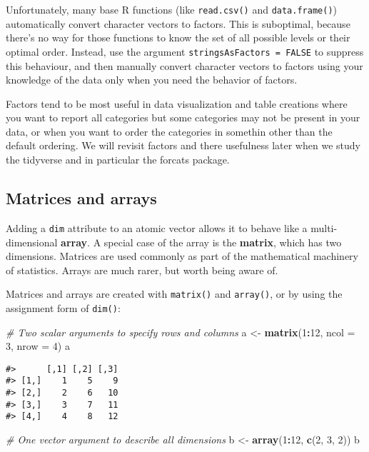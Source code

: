 \documentclass[]{book}
\newenvironment{Shaded}{\begin{snugshade}}{\end{snugshade}}
\newcommand{\KeywordTok}[1]{\textcolor[rgb]{0.13,0.29,0.53}{\textbf{#1}}}
\newcommand{\DataTypeTok}[1]{\textcolor[rgb]{0.13,0.29,0.53}{#1}}
\newcommand{\DecValTok}[1]{\textcolor[rgb]{0.00,0.00,0.81}{#1}}
\newcommand{\StringTok}[1]{\textcolor[rgb]{0.31,0.60,0.02}{#1}}
\newcommand{\CommentTok}[1]{\textcolor[rgb]{0.56,0.35,0.01}{\textit{#1}}}
\newcommand{\OperatorTok}[1]{\textcolor[rgb]{0.81,0.36,0.00}{\textbf{#1}}}
\newcommand{\NormalTok}[1]{#1}
\theoremstyle{definition}
\theoremstyle{definition}
\theoremstyle{definition}
\theoremstyle{remark}
\begin{document}
Unfortunately, many base R functions (like \texttt{read.csv()} and
\texttt{data.frame()}) automatically convert character vectors to
factors. This is suboptimal, because there's no way for those functions
to know the set of all possible levels or their optimal order. Instead,
use the argument \texttt{stringsAsFactors\ =\ FALSE} to suppress this
behaviour, and then manually convert character vectors to factors using
your knowledge of the data only when you need the behavior of factors.

Factors tend to be most useful in data visualization and table creations
where you want to report all categories but some categories may not be
present in your data, or when you want to order the categories in
somethin other than the default ordering. We will revisit factors and
there usefulness later when we study the tidyverse and in particular the
forcats package.

\subsection{Matrices and arrays}\label{matrices-and-arrays}

Adding a \texttt{dim} attribute to an atomic vector allows it to behave
like a multi-dimensional \textbf{array}. A special case of the array is
the \textbf{matrix}, which has two dimensions. Matrices are used
commonly as part of the mathematical machinery of statistics. Arrays are
much rarer, but worth being aware of.

Matrices and arrays are created with \texttt{matrix()} and
\texttt{array()}, or by using the assignment form of \texttt{dim()}:

\begin{Shaded}
\begin{Highlighting}[]
\CommentTok{# Two scalar arguments to specify rows and columns}
\NormalTok{a <-}\StringTok{ }\KeywordTok{matrix}\NormalTok{(}\DecValTok{1}\OperatorTok{:}\DecValTok{12}\NormalTok{, }\DataTypeTok{ncol =} \DecValTok{3}\NormalTok{, }\DataTypeTok{nrow =} \DecValTok{4}\NormalTok{)}
\NormalTok{a}
\end{Highlighting}
\end{Shaded}

\begin{verbatim}
#>      [,1] [,2] [,3]
#> [1,]    1    5    9
#> [2,]    2    6   10
#> [3,]    3    7   11
#> [4,]    4    8   12
\end{verbatim}

\begin{Shaded}
\begin{Highlighting}[]
\CommentTok{# One vector argument to describe all dimensions}
\NormalTok{b <-}\StringTok{ }\KeywordTok{array}\NormalTok{(}\DecValTok{1}\OperatorTok{:}\DecValTok{12}\NormalTok{, }\KeywordTok{c}\NormalTok{(}\DecValTok{2}\NormalTok{, }\DecValTok{3}\NormalTok{, }\DecValTok{2}\NormalTok{))}
\NormalTok{b}
\end{Highlighting}
\end{Shaded}
\end{document}
